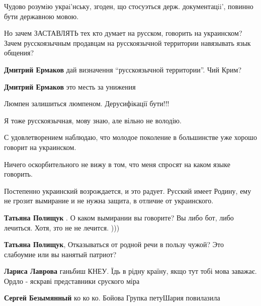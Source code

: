 \begin{itemize}
Чудово розумiю украi'нську, згоден, що стосуэться держ. документацii', повинно бути державною мовою.

Но зачем ЗАСТАВЛЯТЬ тех кто думает на русском, говорить на украинском? Зачем
русскоязычным продавцам на русскоязычной территории навязывать язык общения?


\textbf{Дмитрий Ермаков} дай визначення \enquote{русскоязычной территории}. Чий Крим?

\textbf{Дмитрий Ермаков} это месть за унижения

Люмпен залишиться люмпеном. Дерусифікації бути!!!


Я тоже русскоязычная, мову знаю, але вільно не володію.

С удовлетворением наблюдаю, что молодое поколение в большинстве уже хорошо
говорит на украинском.

Ничего оскорбительного не вижу в том, что меня спросят на каком языке говорить.

Постепенно украинский возрождается, и это радует. Русский имеет Родину, ему не
грозит вымирание и не нужна защита, в отличие от украинского.

\begin{itemize}
\textbf{Татьяна Полищук} . О каком вымирании вы говорите? Вы либо бот, либо лечиться. Хотя, зто не не лечится. )))

\textbf{Татьяна Полищук}, Отказываться от родной речи в пользу чужой? Это слабоумие или вы нанятый патриот?

\textbf{Лариса Лаврова} ганьбиш КНЕУ. Їдь в рідну країну, якщо тут тобі мова заважає. Ордло - яскраві представники сруского міра

\textbf{Сергей Безымянный} ко ко ко. Бойова Групка петуШария повилазила


\end{itemize}
\end{itemize}
